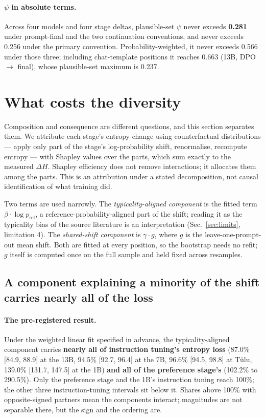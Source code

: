 \documentclass[11pt]{article}
\begin{document}
\paragraph{$\psi$ in absolute terms.} Across four models and four stage deltas,
plausible-set $\psi$ never exceeds \textbf{0.281} under prompt-final and the two
continuation conventions, and never exceeds 0.256 under the primary convention.
Probability-weighted, it never exceeds 0.566 under those three; including
chat-template positions it reaches 0.663 (13B, DPO $\to$ final), whose
plausible-set maximum is 0.237.

\section{What costs the diversity}
\label{sec:cost}

Composition and consequence are different questions, and this section separates
them. We attribute each stage's entropy change using counterfactual
distributions --- apply only part of the stage's log-probability shift,
renormalise, recompute entropy --- with Shapley values over the parts, which sum
exactly to the measured $\Delta H$. Shapley efficiency does not remove interactions;
it allocates them among the parts. This is an attribution under a stated
decomposition, not causal identification of what training did.

Two terms are used narrowly. The \emph{typicality-aligned component} is the fitted
term $\beta \cdot \log p_{\mathrm{ref}}$, a reference-probability-aligned part of the
shift; reading it as the typicality bias of the source literature is an
interpretation (Sec.~\ref{sec:limits}, limitation 4). The \emph{shared-shift
component} is $\gamma \cdot g$, where $g$ is the leave-one-prompt-out mean shift.
Both are fitted at every position, so the bootstrap needs no refit; $g$ itself is
computed once on the full sample and held fixed across resamples.

\subsection{A component explaining a minority of the shift carries nearly all of the loss}
\label{sec:minority}

\paragraph{The pre-registered result.} Under the weighted linear fit specified in
advance, the typicality-aligned component carries \textbf{nearly all of instruction
tuning's entropy loss} (87.0\% [84.9, 88.9] at the 13B, 94.5\% [92.7, 96.4] at the
7B, 96.6\% [94.5, 98.8] at T\"ulu, 139.0\% [131.7, 147.5] at the 1B) \textbf{and
all of the preference stage's} (102.2\% to 290.5\%). Only the preference stage and
the 1B's instruction tuning reach 100\%; the other three instruction-tuning
intervals sit below it. Shares above 100\% with opposite-signed partners mean the
components interact; magnitudes are not separable there, but the sign and the
ordering are.
\end{document}
